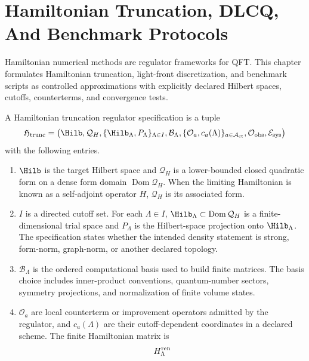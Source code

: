 \chapter{Hamiltonian Truncation, DLCQ, And Benchmark Protocols}
\label{ch:constructive-hamiltonian-truncation-dlcq-benchmarks}

\ConventionsLorentzian

Hamiltonian numerical methods are regulator frameworks for QFT.  This
chapter formulates Hamiltonian truncation, light-front discretization, and
benchmark scripts as controlled approximations with explicitly declared
Hilbert spaces, cutoffs, counterterms, and convergence tests.

\begin{definition}
\label{def:hamiltonian-truncation-regulator-datum}
A Hamiltonian truncation regulator specification is a tuple
\[
  \mathfrak H_{\rm trunc}
  =
  \bigl(
    \Hilb,\mathcal Q_H,
    \{\Hilb_\Lambda,P_\Lambda\}_{\Lambda\in I},
    \mathcal B_\Lambda,
    \{\mathcal O_a,c_a(\Lambda)\}_{a\in\mathcal A_{\rm ct}},
    \mathcal O_{\rm obs},
    \mathcal E_{\rm sys}
  \bigr)
\]
with the following entries.
\begin{enumerate}[label=\textnormal{(\roman*)}]
\item \(\Hilb\) is the target Hilbert space and \(\mathcal Q_H\) is a
  lower-bounded closed quadratic form on a dense form domain
  \(\operatorname{Dom}\mathcal Q_H\).  When the limiting Hamiltonian is known
  as a self-adjoint operator \(H\), \(\mathcal Q_H\) is its associated form.
\item \(I\) is a directed cutoff set.  For each \(\Lambda\in I\),
  \(\Hilb_\Lambda\subset\operatorname{Dom}\mathcal Q_H\) is a
  finite-dimensional trial space and \(P_\Lambda\) is the Hilbert-space
  projection onto \(\Hilb_\Lambda\).  The specification states whether the intended
  density statement is strong, form-norm, graph-norm, or another declared
  topology.
\item \(\mathcal B_\Lambda\) is the ordered computational basis used to build
  finite matrices.  The basis choice includes inner-product conventions,
  quantum-number sectors, symmetry projections, and normalization of finite
  volume states.
\item \(\mathcal O_a\) are local counterterm or improvement operators admitted
  by the regulator, and \(c_a(\Lambda)\) are their cutoff-dependent
  coordinates in a declared scheme.  The finite Hamiltonian matrix is
  \[
    H_\Lambda^{\rm ren}
\]
\end{enumerate}
\end{definition}
